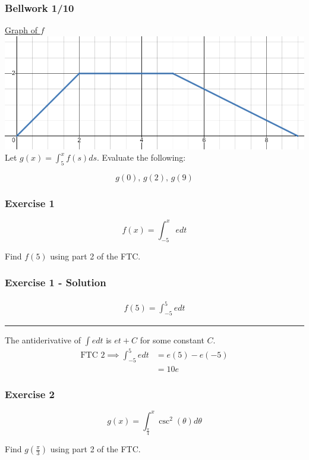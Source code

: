 \documentclass[12pt]{beamer}
\begin{document}
\begin{frame}
	\frametitle{Bellwork 1/10}
	\initclock

	\begin{center}
		\large
		\underline{Graph of $f$}
		\includegraphics[scale=0.4]{bellwork_graph.png}\\
		Let $g(x) = \int_{5}^{x}f(s)ds$. Evaluate the following:
	\end{center}
	\[g(0)\text{, }g(2)\text{, }g(9)\]

	\vfill

	\small
	\crono
\end{frame}
\begin{frame}
	\frametitle{Exercise 1}

	\vfill
	\vfill
	\Large
	\[f(x)=\int_{-5}^{x}edt\]
	\vfill
	\begin{center}
		Find $f(5)$ using part 2 of the FTC.
	\end{center}
	\vfill
	\vfill
\end{frame}
\begin{frame}
	\frametitle{Exercise 1 - Solution}

	\Large
	\begin{align*}
		f(5)=\int_{-5}^{5}edt
	\end{align*}
	\small
	\hrule
	\vfill
	\vfill
	The antiderivative of $\int edt$ is $et+C$ for some constant $C$.
	\large
	\begin{align*}
		\text{FTC 2}\implies \int_{-5}^{5}edt &= e(5)-e(-5) \\
		&= \boxed{10e}
	\end{align*}
	\vfill
	\vfill
	\vfill
\end{frame}
\begin{frame}
	\frametitle{Exercise 2}

	\vfill
	\vfill
	\Large
	\[g(x)=\int_{\frac{\pi}{4}}^{x}\csc^2\left(\theta\right)d\theta\]
	\vfill
	\begin{center}
		Find $g(\frac{\pi}{3})$ using part 2 of the FTC.
	\end{center}
	\vfill
	\vfill
\end{frame}
\end{document}
